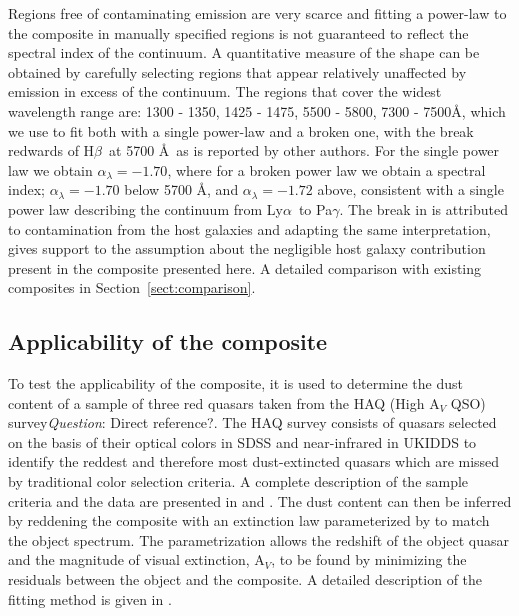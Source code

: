 \documentclass{aa}    %
\newcommand{\sectionname}{Section}
\newcommand{\Sect}[1]{\sectionname~\ref{sect:#1}}
\newcommand{\sect}[1]{\Sect{#1}}
\newcommand{\sectlabel}[1]{\label{sect:#1}}
\newcommand{\lya}{Ly$\alpha$}
\newcommand{\hb}{H$\beta$}
\newcommand{\todo}[3]{{\color{#2}\emph{#1}: #3}}
\newcommand{\qtodo}[1]{\todo{Question}{red}{#1}}
\begin{document}
Regions free of contaminating emission are very scarce and fitting a power-law to the composite in manually specified regions is not guaranteed to reflect the spectral index of the continuum. A quantitative measure of the shape can be obtained by carefully selecting regions that appear relatively unaffected by emission in excess of the continuum. The regions that cover the widest wavelength range are: 1300 - 1350, 1425 - 1475, 5500 - 5800, 7300 - 7500\AA, which we use to fit both with a single power-law and a broken one, with the break redwards of \hb~at 5700 \AA~as is reported by other authors\citep{VandenBerk2001}. For the single power law we obtain $\alpha_\lambda = -1.70$, where for a broken power law we obtain a spectral index; $\alpha_\lambda = -1.70$ below 5700 \AA, and $\alpha_\lambda = -1.72$ above, consistent with a single power law describing the continuum from  \lya ~to Pa$\gamma$. The break in \cite{VandenBerk2001} is attributed to contamination from the host galaxies\citep{Glikman2006} and adapting the same interpretation, gives support to the assumption about the negligible host galaxy contribution present in the composite presented here. A detailed comparison with existing composites in \sect{comparison}.


\subsection{Applicability of the composite}  \sectlabel{application}


To test the applicability of the composite, it is used to determine the dust content of a sample of three red quasars taken from the HAQ (High A$_V$ QSO) survey\qtodo{Direct reference?}. The HAQ survey consists of quasars selected on the basis of their optical colors in SDSS and near-infrared in UKIDDS to identify the reddest and therefore most dust-extincted quasars which are missed by traditional color selection criteria. A complete description of the sample criteria and the data are presented in \citet{Fynbo2013} and \citet{Krogager2015}. The dust content can then be inferred by reddening the composite with an extinction law parameterized by \cite{Gordon2003} to match the object spectrum. The parametrization allows the redshift of the object quasar and the magnitude of visual extinction, A$_V$, to be found by minimizing the residuals between the object and the composite. A detailed description of the fitting method is given in \cite{Krogager2015}.
\end{document}
